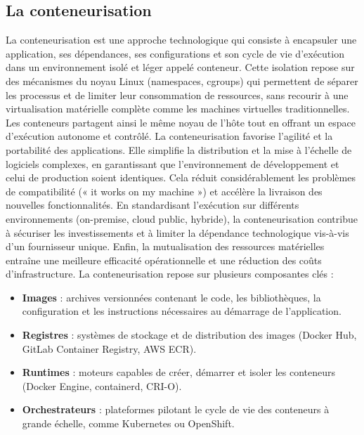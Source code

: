 \subsection{La conteneurisation}

La conteneurisation est une approche technologique qui consiste à encapsuler une application, ses dépendances, ses configurations et son cycle de vie d’exécution dans un environnement isolé et léger appelé conteneur. Cette isolation repose sur des mécanismes du noyau Linux (namespaces, cgroups) qui permettent de séparer les processus et de limiter leur consommation de ressources, sans recourir à une virtualisation matérielle complète comme les machines virtuelles traditionnelles. Les conteneurs partagent ainsi le même noyau de l’hôte tout en offrant un espace d’exécution autonome et contrôlé.
La conteneurisation favorise l’agilité et la portabilité des applications. Elle simplifie la distribution et la mise à l’échelle de logiciels complexes, en garantissant que l’environnement de développement et celui de production soient identiques. Cela réduit considérablement les problèmes de compatibilité (« it works on my machine ») et accélère la livraison des nouvelles fonctionnalités. En standardisant l’exécution sur différents environnements (on-premise, cloud public, hybride), la conteneurisation contribue à sécuriser les investissements et à limiter la dépendance technologique vis-à-vis d’un fournisseur unique. Enfin, la mutualisation des ressources matérielles entraîne une meilleure efficacité opérationnelle et une réduction des coûts d’infrastructure.
La conteneurisation repose sur plusieurs composantes clés :
\begin{itemize}
	\item \textbf{Images} : archives versionnées contenant le code, les bibliothèques, la configuration et les instructions nécessaires au démarrage de l’application.
	\item \textbf{Registres} : systèmes de stockage et de distribution des images (Docker Hub, GitLab Container Registry, AWS ECR).
	\item \textbf{Runtimes} : moteurs capables de créer, démarrer et isoler les conteneurs (Docker Engine, containerd, CRI-O).
	\item \textbf{Orchestrateurs} : plateformes pilotant le cycle de vie des conteneurs à grande échelle, comme Kubernetes ou OpenShift.
\end{itemize}

